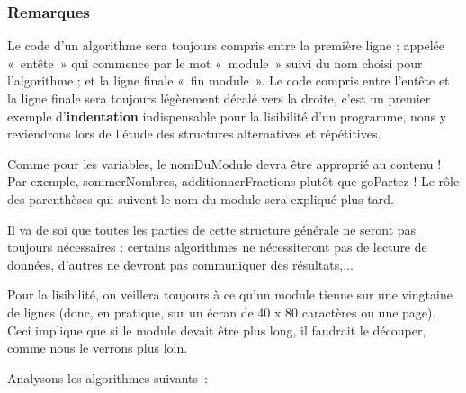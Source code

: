 
		\subsubsection*{Remarques}
		
		\begin{liste}
		\item {
			Le code d'un algorithme sera toujours compris entre la
			première ligne ; appelée «~entête~» qui commence par le mot «~module~»
			suivi du nom choisi pour l'algorithme ; et la ligne
			finale «~fin module~». Le code compris entre l'entête
			et la ligne finale sera toujours légèrement décalé vers la droite,
			c'est un premier exemple
			d'\textbf{indentation} indispensable pour la
			lisibilité d'un programme, nous y reviendrons lors de
			l'étude des structures alternatives et répétitives.}
		\item {
			Comme pour les variables, le nomDuModule devra être approprié au contenu
			! Par exemple, sommerNombres, additionnerFractions plutôt que goPartez
			!
			Le rôle des parenthèses qui suivent le nom du module sera expliqué plus
			tard.}
		\item {
			Il va de soi que toutes les parties de cette structure générale ne
			seront pas toujours nécessaires : certains algorithmes ne nécessiteront
			pas de lecture de données, d'autres ne devront pas
			communiquer des résultats,...}
		\item {
			Pour la lisibilité, on veillera toujours à ce qu'un module
			tienne sur une vingtaine de lignes (donc, en pratique, sur un écran 
			de 40 x 80 caractères ou une page). Ceci implique que si le module 
			devait être plus long, il faudrait le découper, comme nous le verrons 
			plus loin.}
		\end{liste}

		\bigskip

		Analysons les algorithmes suivants~:
		
		
